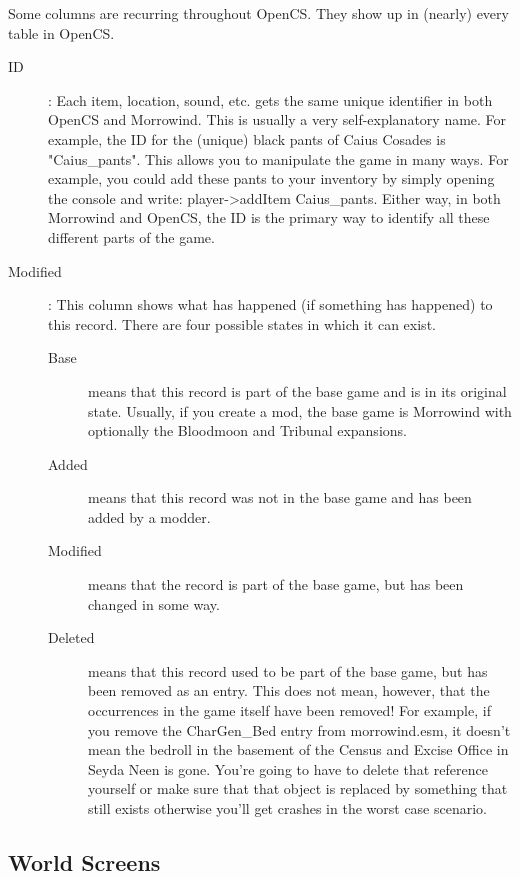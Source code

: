 Some columns are recurring throughout OpenCS. They show up in (nearly) every table in OpenCS.

\begin{description}
 \item[ID]: Each item, location, sound, etc. gets the same unique identifier in both OpenCS and Morrowind. This is usually a very self-explanatory name. For example, the ID for the (unique) black pants of Caius Cosades is "Caius_pants". This allows you to manipulate the game in many ways. For example, you could add these pants to your inventory by simply opening the console and write: player->addItem Caius_pants. Either way, in both Morrowind and OpenCS, the ID is the primary way to identify all these different parts of the game.

 \item[Modified]: This column shows what has happened (if something has happened) to this record. There are four possible states in which it can exist. 
 \begin{description}
  \item[Base] means that this record is part of the base game and is in its original state. Usually, if you create a mod, the base game is Morrowind with optionally the Bloodmoon and Tribunal expansions.
  \item[Added] means that this record was not in the base game and has been added by a modder.
  \item[Modified] means that the record is part of the base game, but has been changed in some way.
  \item[Deleted] means that this record used to be part of the base game, but has been removed as an entry. This does not mean, however, that the occurrences in the game itself have been removed! For example, if you remove the CharGen_Bed entry from morrowind.esm, it doesn't mean the bedroll in the basement of the Census and Excise Office in Seyda Neen is gone. You're going to have to delete that reference yourself or make sure that that object is replaced by something that still exists otherwise you'll get crashes in the worst case scenario.
 \end{description}
\end{description}



\subsection{World Screens}

